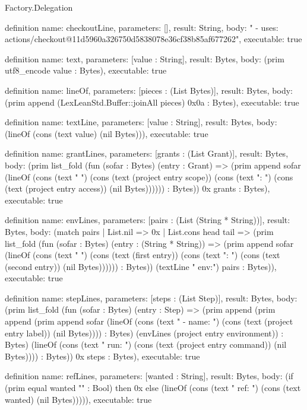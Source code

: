 \begin{lexlean}{Factory.Delegation}
\begin{semanticmodule}
definition{
  name: checkoutLine,
  parameters: [],
  result: String,
  body: "      - uses: actions/checkout@11d5960a326750d5838078e36cf38b85af677262",
  executable: true
}

definition{
  name: text,
  parameters: [value : String],
  result: Bytes,
  body: (prim utf8_encode value : Bytes),
  executable: true
}

definition{
  name: lineOf,
  parameters: [pieces : (List Bytes)],
  result: Bytes,
  body: (prim append (LexLeanStd.Buffer::joinAll pieces) 0x0a : Bytes),
  executable: true
}

definition{
  name: textLine,
  parameters: [value : String],
  result: Bytes,
  body: (lineOf (cons (text value) (nil Bytes))),
  executable: true
}

definition{
  name: grantLines,
  parameters: [grants : (List Grant)],
  result: Bytes,
  body: (prim list_fold (fun (sofar : Bytes) (entry : Grant) => (prim append sofar (lineOf (cons (text "      ") (cons (text (project entry scope)) (cons (text ": ") (cons (text (project entry access)) (nil Bytes)))))) : Bytes)) 0x grants : Bytes),
  executable: true
}

definition{
  name: envLines,
  parameters: [pairs : (List (String * String))],
  result: Bytes,
  body: (match pairs
      | List.nil => 0x
      | List.cons head tail => (prim list_fold (fun (sofar : Bytes) (entry : (String * String)) => (prim append sofar (lineOf (cons (text "          ") (cons (text (first entry)) (cons (text ": ") (cons (text (second entry)) (nil Bytes)))))) : Bytes)) (textLine "        env:") pairs : Bytes)),
  executable: true
}

definition{
  name: stepLines,
  parameters: [steps : (List Step)],
  result: Bytes,
  body: (prim list_fold (fun (sofar : Bytes) (entry : Step) => (prim append (prim append (prim append sofar (lineOf (cons (text "      - name: ") (cons (text (project entry label)) (nil Bytes)))) : Bytes) (envLines (project entry environment)) : Bytes) (lineOf (cons (text "        run: ") (cons (text (project entry command)) (nil Bytes)))) : Bytes)) 0x steps : Bytes),
  executable: true
}

definition{
  name: refLines,
  parameters: [wanted : String],
  result: Bytes,
  body: (if (prim equal wanted "" : Bool) then 0x else (lineOf (cons (text "          ref: ") (cons (text wanted) (nil Bytes))))),
  executable: true
}


\end{semanticmodule}
\end{lexlean}
